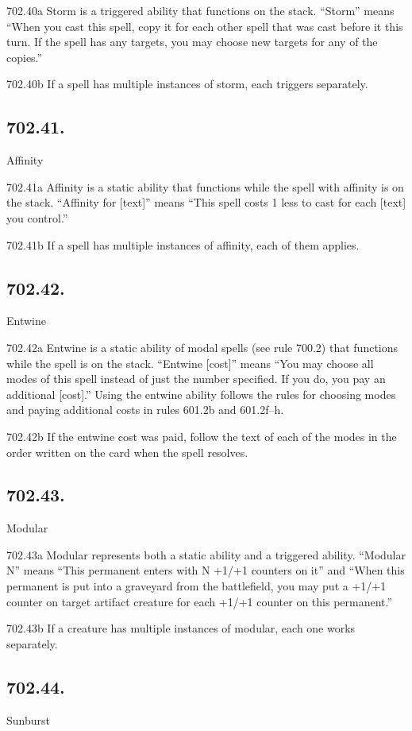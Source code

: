 702.40a Storm is a triggered ability that functions on the stack. “Storm” means “When you cast this spell, copy it for each other spell that was cast before it this turn. If the spell has any targets, you may choose new targets for any of the copies.”

702.40b If a spell has multiple instances of storm, each triggers separately.

\subsection*{702.41.}
Affinity

702.41a Affinity is a static ability that functions while the spell with affinity is on the stack. “Affinity for [text]” means “This spell costs {1} less to cast for each [text] you control.”

702.41b If a spell has multiple instances of affinity, each of them applies.

\subsection*{702.42.}
Entwine

702.42a Entwine is a static ability of modal spells (see rule 700.2) that functions while the spell is on the stack. “Entwine [cost]” means “You may choose all modes of this spell instead of just the number specified. If you do, you pay an additional [cost].” Using the entwine ability follows the rules for choosing modes and paying additional costs in rules 601.2b and 601.2f–h.

702.42b If the entwine cost was paid, follow the text of each of the modes in the order written on the card when the spell resolves.

\subsection*{702.43.}
Modular

702.43a Modular represents both a static ability and a triggered ability. “Modular N” means “This permanent enters with N +1/+1 counters on it” and “When this permanent is put into a graveyard from the battlefield, you may put a +1/+1 counter on target artifact creature for each +1/+1 counter on this permanent.”

702.43b If a creature has multiple instances of modular, each one works separately.

\subsection*{702.44.}
Sunburst

